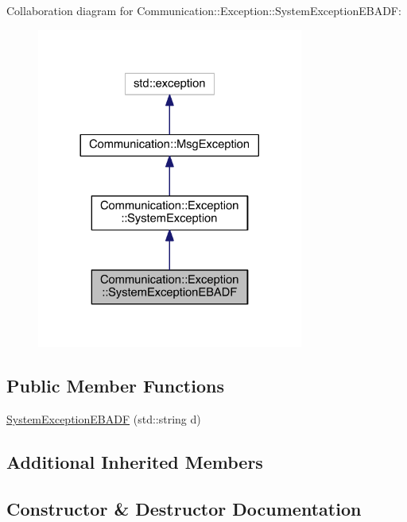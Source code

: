 Collaboration diagram for Communication\+:\+:Exception\+:\+:System\+Exception\+E\+B\+A\+D\+F\+:\nopagebreak
\begin{figure}[H]
\begin{center}
\leavevmode
\includegraphics[width=248pt]{class_communication_1_1_exception_1_1_system_exception_e_b_a_d_f__coll__graph}
\end{center}
\end{figure}
\subsection*{Public Member Functions}
\begin{DoxyCompactItemize}
\item 
\hyperlink{class_communication_1_1_exception_1_1_system_exception_e_b_a_d_f_a25ff5e9c813683e9abaa1fd0f3a58c2f}{System\+Exception\+E\+B\+A\+D\+F} (std\+::string d)
\end{DoxyCompactItemize}
\subsection*{Additional Inherited Members}


\subsection{Constructor \& Destructor Documentation}
\hypertarget{class_communication_1_1_exception_1_1_system_exception_e_b_a_d_f_a25ff5e9c813683e9abaa1fd0f3a58c2f}{}

